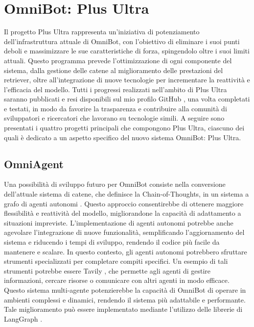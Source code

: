 \chapter{OmniBot: Plus Ultra}
Il progetto Plus Ultra rappresenta un'iniziativa di potenziamento dell'infrastruttura attuale di OmniBot, con l'obiettivo di eliminare i suoi punti deboli e massimizzare le sue caratteristiche di forza, spingendolo oltre i suoi limiti attuali. Questo programma prevede l'ottimizzazione di ogni componente del sistema, dalla gestione delle catene al miglioramento delle prestazioni del retriever, oltre all'integrazione di nuove tecnologie per incrementare la reattività e l'efficacia del modello.
Tutti i progressi realizzati nell'ambito di Plus Ultra saranno pubblicati e resi disponibili sul mio profilo GitHub \cite{github}, una volta completati e testati, in modo da favorire la trasparenza e contribuire alla comunità di sviluppatori e ricercatori che lavorano su tecnologie simili. A seguire sono presentati i quattro progetti principali che compongono Plus Ultra, ciascuno dei quali è dedicato a un aspetto specifico del nuovo sistema OmniBot: Plus Ultra.

\section{OmniAgent}
Una possibilità di sviluppo futuro per OmniBot consiste nella conversione dell'attuale sistema di catene, che definisce la Chain-of-Thoughts, in un sistema a grafo di agenti autonomi \cite{Wang_2024,Besta_2024,yao2023treethoughtsdeliberateproblem}. Questo approccio consentirebbe di ottenere maggiore flessibilità e reattività del modello, migliorandone la capacità di adattamento a situazioni impreviste. L'implementazione di agenti autonomi potrebbe anche agevolare l'integrazione di nuove funzionalità, semplificando l'aggiornamento del sistema e riducendo i tempi di sviluppo, rendendo il codice più facile da mantenere e scalare.
In questo contesto, gli agenti autonomi potrebbero sfruttare strumenti specializzati per completare compiti specifici. Un esempio di tali strumenti potrebbe essere Tavily \cite{tavily}, che permette agli agenti di gestire informazioni, cercare risorse o comunicare con altri agenti in modo efficace. Questo sistema multi-agente potenzierebbe la capacità di OmniBot di operare in ambienti complessi e dinamici, rendendo il sistema più adattabile e performante. Tale miglioramento può essere implementato mediante l'utilizzo delle librerie di LangGraph \cite{langgraph}.

